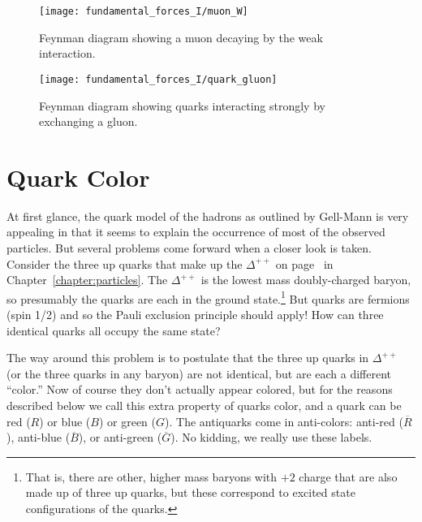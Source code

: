 \begin{figure}[tbp]
\begin{minipage}[t]{6.0cm}
\begin{center}
\texttt{[image: fundamental\_forces\_I/muon\_W]}
\caption{Feynman diagram showing a muon decaying by the weak
interaction.} \label{fig:muon_W}
\end{center}
\end{minipage}
\hfill
\begin{minipage}[t]{6.0cm}
\begin{center}
\texttt{[image: fundamental\_forces\_I/quark\_gluon]}
\caption{Feynman diagram showing quarks interacting strongly by
exchanging a gluon.} \label{fig:quark_gluon}
\end{center}
\end{minipage}
\end{figure}

\section{Quark Color}
\label{sec:quark_color}

At first glance, the quark model of the hadrons as outlined by
Gell-Mann is very appealing in that it seems to explain the occurrence
of most of the observed particles.  But several problems come forward
when a closer look is taken.  Consider the three up quarks that make
up the $\Delta^{++}$ on page~\pageref{ex:delta} in 
Chapter~\ref{chapter:particles}.  The $\Delta^{++}$ is the lowest
mass doubly-charged baryon, so presumably the quarks are each in the
ground state.\footnote{That is, there are other, higher mass baryons
with $+2$ charge that are also made up of three up quarks, but these
correspond to excited state configurations of the quarks.}  But quarks
are fermions (spin 1/2) and so the Pauli exclusion principle should
apply!  How can three identical quarks all occupy the same state?

The way around this problem is to postulate that the three up quarks
in $\Delta^{++}$ (or the three quarks in any baryon) are not
identical, but are each a different ``color.''  Now of course they
don't actually appear colored, but for the reasons described below we
call this extra property of quarks color, and a quark can be red ($R$)
or blue ($B$) or green ($G$).  The antiquarks come in anti-colors:
anti-red ($\overline R$), anti-blue ($\overline B$), or anti-green
($\overline G$).  No kidding, we really use these labels.

